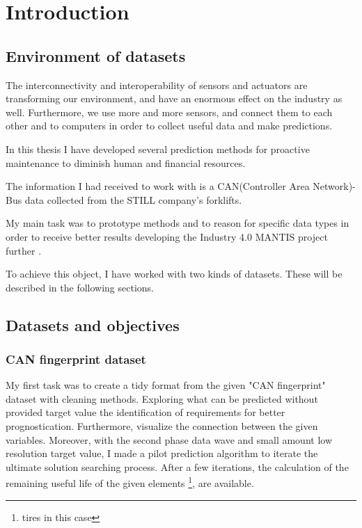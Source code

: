 \chapter{Introduction}
\section{Environment of datasets}
The interconnectivity and interoperability \cite{TalebArchInsSys} of sensors and actuators are transforming our environment, and have an enormous effect on the industry as well. Furthermore, we use more and more sensors, and connect them to each other and to computers in order to collect useful data and make predictions.

In this thesis I have developed several prediction methods for proactive maintenance to diminish human and financial resources.

The information I had received to work with is a CAN(Controller Area Network)-Bus data collected from the STILL company's forklifts.

My main task was to prototype methods and to reason for specific data types in order to receive better results developing the Industry 4.0 \cite{Indfourpointzero} MANTIS project further \cite{PaliHCsCPS,HCsCPS2,GartnerIoT,HuangCPS,PaliCPS,HCsCPS,ProMain}.

To achieve this object, I have worked with two kinds of datasets. These will be described in the following sections.
\section{Datasets and objectives}
    \subsection{CAN fingerprint dataset}
\noindent
My first task was to create a tidy format from the given "CAN fingerprint" dataset with cleaning methods. Exploring what can be predicted without provided target value  the identification of requirements for better prognostication. Furthermore, visualize the connection between the given variables. Moreover, with the second phase data wave and small amount low resolution target value, I made a pilot prediction algorithm to iterate the ultimate solution searching process. 
\noindent
After a few iterations, the calculation of the remaining useful life of the given elements \footnote{tires in this case}, are available. 

